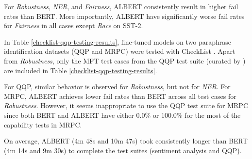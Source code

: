 \documentclass{article}
\begin{document}
For \emph{Robustness}, \emph{NER}, and \emph{Fairness}, ALBERT consistently result in higher fail rates than BERT. More importantly, ALBERT have significantly worse fail rates for \emph{Fairness} in all cases except \emph{Race} on SST-2. 

In Table \ref{checklist-qqp-testing-results}, fine-tuned models on two paraphrase identification datasets (QQP and MRPC) were tested with CheckList \cite{Ribeiro2020BeyondAB}. Apart from \emph{Robustness}, only the MFT test cases from the QQP test suite (curated by \citet{Ribeiro2020BeyondAB}) are included in Table \ref{checklist-qqp-testing-results}.

For QQP, similar behavior is observed for \emph{Robustness}, but not for \emph{NER}. For MRPC, ALBERT achieves lower fail rates than BERT across all test cases for \emph{Robustness}. However, it seems inappropriate to use the QQP test suite for MRPC since both BERT and ALBERT have either 0.0\% or 100.0\% for the most of the capability tests in MRPC.

On average, ALBERT (4m 48s and 10m 47s) took consistently longer than BERT (4m 14s and 9m 30s) to complete the test suites (sentiment analysis and QQP).

\clearpage
\end{document}
